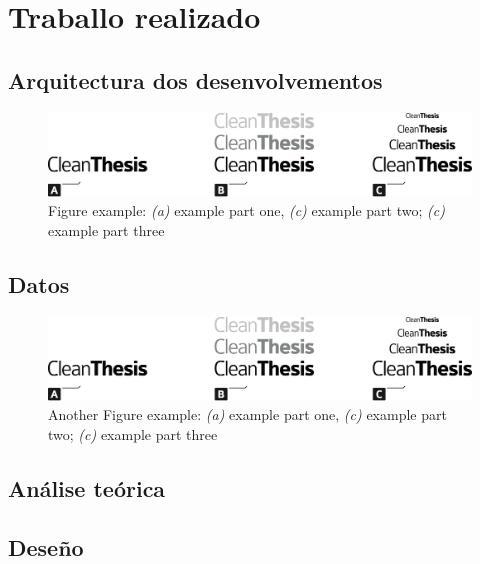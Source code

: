 %
\chapter{Traballo realizado}
\label{sec:system}



{
\color{gray}
\Blindtext[2][1]
}

\section{Arquitectura dos desenvolvementos}
\label{sec:system:sec1}
{
\color{gray}
\Blindtext[1][2]
}

\begin{figure}[htb]
	\includegraphics[width=\textwidth]{images/Clean-Thesis-Figure}
	\caption{Figure example: \textit{(a)} example part one, \textit{(c)} example part two; \textit{(c)} example part three}
	\label{fig:system:example1}
\end{figure}

{
\color{gray}
\Blindtext[1][2]
}

\section{Datos}
\label{sec:system:sec2}

{
\color{gray}
\Blindtext[1][2]
}

\begin{figure}[htb]
	\includegraphics[width=\textwidth]{images/Clean-Thesis-Figure}
	\caption{Another Figure example: \textit{(a)} example part one, \textit{(c)} example part two; \textit{(c)} example part three}
	\label{fig:system:example2}
\end{figure}

{
\color{gray}
\Blindtext[2][2]
}

\section{Análise teórica}
\label{sec:system:sec3}
{
\color{gray}
\Blindtext[4][2]
}

\section{Deseño}
\label{sec:system:design}
{
\color{gray}
\Blindtext[2][1]
}